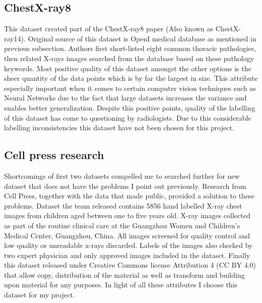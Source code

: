 \documentclass[12pt, twoside, a4paper]{article}
\begin{document}
\subsection{ChestX-ray8}
This dataset created part of the ChestX-ray8\cite{ChestX-ray8} paper (Also known as ChestX-ray14). Original source of this dataset is OpenI\cite{openi} medical database as mentioned in previous subsection. Authors first short-listed eight common thoracic pathologies, then related X-rays images searched from the database based on these pathology keywords. Most positive quality of this dataset amongst the other options is the sheer quantity of the data points which is by far the largest in size. This attribute especially important when it comes to certain computer vision techniques such as Neural Networks due to the fact that large datasets increases the variance and enables better generalization. Despite this positive points, quality of the labelling of this dataset has come to questioning by radiologists\cite{counterray8}. Due to this considerable labelling inconsistencies this dataset have not been chosen for this project.

\subsection{Cell press research}
Shortcomings of first two datasets compelled me to searched further for new dataset that does not have the problems I point out previously. Research from Cell Press\cite{dataset}, together with the data that made public, provided a solution to these problems. Dataset the team released contains 5856 hand labelled X-ray chest images from children aged between one to five years old. X-ray images collected as part of the routine clinical care at the Guangzhou Women and Children’s Medical Center, Guangzhou, China. All images screened for quality control and low quality or unreadable x-rays discarded. Labels of the images also checked by two expert physician and only approved images included in the dataset. Finally this dataset released under Creative Commons license Attribution 4 (CC BY 4.0) that allow copy, distribution of the material as well as transform and building upon material for any purposes. In light of all these attributes I choose this dataset for my project.

\clearpage
\end{document}

